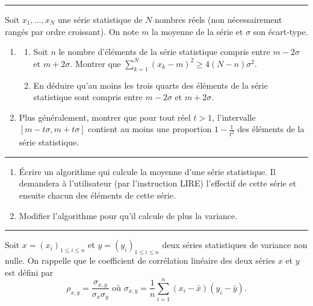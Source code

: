 \documentclass[../PolyS4.tex]{subfiles}
\begin{document}
\vspace{1em}
\hrule
\vspace{1em}


Soit $x_1,\ldots,x_N$ une série statistique de $N$ nombres réels (non nécessairement rangés par ordre croissant). On note $m$ la moyenne de la série et $\sigma$ son écart-type.

\begin{enumerate}
 \item 
\begin{enumerate}
\item Soit $n$ le nombre d'éléments de la série statistique compris entre $m-2\sigma$ et $m+2\sigma$. Montrer que $\sum_{k=1}^N(x_k-m)^2\ge 4(N-n)\sigma^2$.
\item En déduire qu'au moins les trois quarts des éléments de la série statistique sont compris entre $m-2\sigma$ et $m+2\sigma$.
\end{enumerate}
\item Plus généralement, montrer que pour tout réel $t>1$, l'intervalle $[m-t\sigma,m+t\sigma]$ contient au moins une proportion $1-\frac1{t^2}$ des éléments de la série statistique.
\end{enumerate}

\vspace{1em}
\hrule
\vspace{1em}


\begin{enumerate}
\item Écrire un algorithme qui calcule la moyenne d'une série statistique. Il demandera à l'utilisateur (par l'instruction LIRE) l'effectif de cette série et ensuite chacun des éléments de cette série. 
\item Modifier l'algorithme pour qu'il calcule de plus la variance.
\end{enumerate}

\vspace{1em}
\hrule
\vspace{1em}


Soit $x=(x_i)_{1\leq i\leq n}$ et $y=(y_i)_{1\leq i\leq n}$ deux séries statistiques de variance non nulle.
On rappelle que le coefficient de corrélation linéaire des deux séries $x$ et $y$ est défini par 
$$\rho_{x,y}=\frac{\sigma_{x,y}}{\sigma_x\sigma_y}\textrm{ où }\sigma_{x,y}=\frac1n\sum_{i=1}^n (x_i-\bar x)(y_i-\bar y).$$
\end{document}
